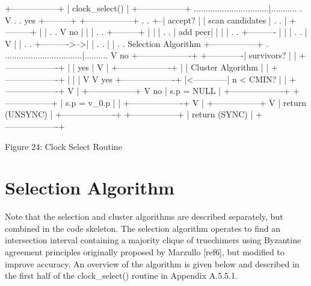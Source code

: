                       +-----------------+
                      | clock\_select()  |
                      +-----------------+
................................|...........
.                               V          .
.      yes +---------+ +-----------------+ .
.       +--| accept? | | scan candidates | .
.       |  +---------+ |                 | .
.       V        no |  |                 | .
.  +---------+      |  |                 | .
.  | add peer|      |  |                 | .
.  +----------      |  |                 | .
.       |           V  |                 | .
.       +---------->-->|                 | .
.                      |                 | .
. Selection Algorithm  +-----------------+ .
.................................|..........
                                V
                    no +-------------------+
        +-------------|     survivors?    |
        |             +-------------------+
        |                       | yes
        |                       V
        |             +-------------------+
        |             | Cluster Algorithm |
        |             +-------------------+
        |                       |
        |                       V
        V         yes +-------------------+
        |<------------|     n < CMIN?     |
        |             +-------------------+
        V                       |
  +-----------------+            V no
  |   s.p = NULL    |  +-------------------+
  +-----------------+  |   s.p = v\_0.p     |
        |             +-------------------+
        V                       |
  +-----------------+            V
  | return (UNSYNC) |  +-------------------+
  +-----------------+  |   return (SYNC)   |
                      +-------------------+

                  Figure 24: Clock Select Routine

\section{Selection Algorithm}

Note that the selection and cluster algorithms are described
separately, but combined in the code skeleton.  The selection
algorithm operates to find an intersection interval containing a
majority clique of truechimers using Byzantine agreement principles
originally proposed by Marzullo [ref6], but modified to improve
accuracy.  An overview of the algorithm is given below and described
in the first half of the clock\_select() routine in Appendix A.5.5.1.

